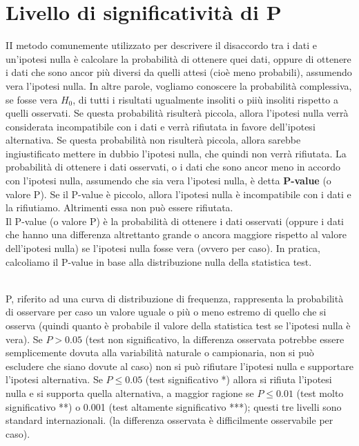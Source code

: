 \documentclass[10pt, draft]{book}
\begin{document}
\section{Livello di significatività di P}
II metodo comunemente utilizzato per descrivere il disaccordo tra i dati e un'ipotesi nulla è calcolare la probabilità di ottenere quei dati, oppure di ottenere i dati che sono ancor più diversi da quelli attesi (cioè meno probabili), assumendo vera l'ipotesi nulla. In altre parole, vogliamo conoscere la probabilità complessiva, se fosse vera $H_0$, di tutti i risultati ugualmente insoliti o piiù insoliti rispetto a quelli osservati. Se questa probabilità risulterà piccola, allora l'ipotesi nulla verrà considerata incompatibile con i dati e verrà rifiutata in favore dell'ipotesi alternativa. Se questa probabilità non risulterà piccola, allora sarebbe ingiustificato mettere in dubbio l'ipotesi nulla, che quindi non verrà rifiutata. La probabilità di ottenere i dati osservati, o i dati che sono ancor meno in accordo con l'ipotesi nulla, assumendo che sia vera l'ipotesi nulla, è detta \textbf{P-value} (o valore P). Se il P-value è piccolo, allora l'ipotesi nulla è incompatibile con i dati e la rifiutiamo. Altrimenti essa non può essere rifiutata.
\\
Il P-value (o valore P) è la probabilità di ottenere i dati osservati (oppure i dati che hanno una differenza altrettanto grande o ancora maggiore rispetto al valore dell'ipotesi nulla) se l'ipotesi nulla fosse vera (ovvero per caso). In pratica, calcoliamo il P-value in base alla distribuzione nulla della statistica test.
\\
\\
\colorbox{lyellow}{\parbox{0.98\textwidth}{
    P, riferito ad una curva di distribuzione di frequenza, rappresenta la probabilità di osservare per caso un valore uguale o più o meno estremo di quello che si osserva (quindi quanto è probabile il valore della statistica test se l’ipotesi nulla è vera). Se $P>0.05$ (test non significativo, la differenza osservata potrebbe essere semplicemente dovuta alla variabilità naturale o campionaria, non si può escludere che siano dovute al caso) non si può rifiutare l’ipotesi nulla e supportare l’ipotesi alternativa. Se $P \le 0.05$ (test significativo *) allora si rifiuta l’ipotesi nulla e si supporta quella alternativa, a maggior ragione se $P \le 0.01$ (test molto significativo **) o 0.001 (test altamente significativo ***); questi tre livelli sono standard internazionali. (la differenza osservata è difficilmente osservabile per caso).}}
\end{document}
